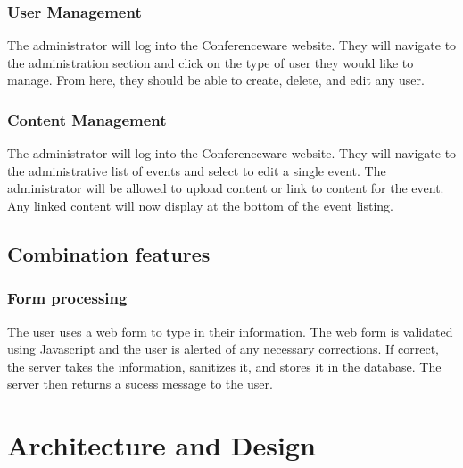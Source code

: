 \documentclass[12pt]{article}
\begin{document}
\subsubsection{User Management}
The administrator will log into the Conferenceware website. They will navigate
to the administration section and click on the type of user they would like to
manage. From here, they should be able to create, delete, and edit any user.
\subsubsection{Content Management}
The administrator will log into the Conferenceware website. They will navigate
to the administrative list of events and select to edit a single event. The
administrator will be allowed to upload content or link to content for the
event. Any linked content will now display at the bottom of the event listing.

\subsection{Combination features}
\subsubsection{Form processing}
The user uses a web form to type in their information. The web form is
validated using Javascript and the user is alerted of any necessary
corrections. If correct, the server takes the information, sanitizes it,
and stores it in the database. The server then returns a sucess message
to the user.

\section{Architecture and Design}
\end{document}
